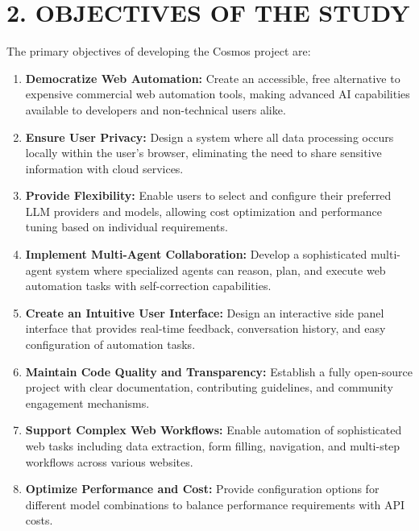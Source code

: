\documentclass[12pt,a4paper]{article}
\begin{document}
\section*{\textbf{2. OBJECTIVES OF THE STUDY}}

The primary objectives of developing the Cosmos project are:

\begin{enumerate}
    \item \textbf{Democratize Web Automation:} Create an accessible, free alternative to expensive commercial web automation tools, making advanced AI capabilities available to developers and non-technical users alike.
    
    \item \textbf{Ensure User Privacy:} Design a system where all data processing occurs locally within the user's browser, eliminating the need to share sensitive information with cloud services.
    
    \item \textbf{Provide Flexibility:} Enable users to select and configure their preferred LLM providers and models, allowing cost optimization and performance tuning based on individual requirements.
    
    \item \textbf{Implement Multi-Agent Collaboration:} Develop a sophisticated multi-agent system where specialized agents can reason, plan, and execute web automation tasks with self-correction capabilities.
    
    \item \textbf{Create an Intuitive User Interface:} Design an interactive side panel interface that provides real-time feedback, conversation history, and easy configuration of automation tasks.
    
    \item \textbf{Maintain Code Quality and Transparency:} Establish a fully open-source project with clear documentation, contributing guidelines, and community engagement mechanisms.
    
    \item \textbf{Support Complex Web Workflows:} Enable automation of sophisticated web tasks including data extraction, form filling, navigation, and multi-step workflows across various websites.
    
    \item \textbf{Optimize Performance and Cost:} Provide configuration options for different model combinations to balance performance requirements with API costs.
\end{enumerate}
\end{document}
